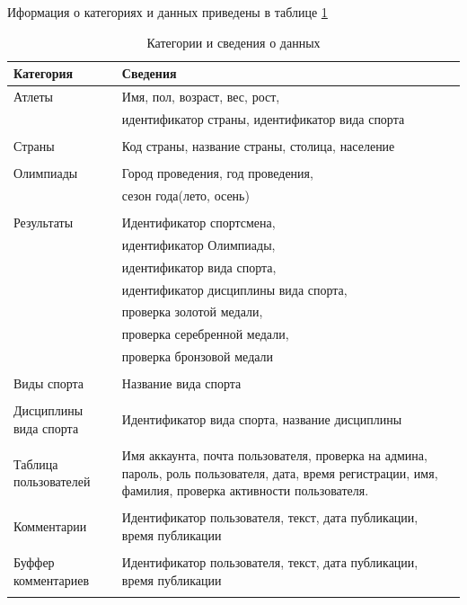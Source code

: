 Иформация о категориях и данных приведены в таблице \ref{tab:category}


\newpage
\begin{table}[h!]
\caption{Категории и сведения о данных}
\label{tab:category}
	\begin{tabular}{ | p{100pt} | p{350pt}  | }
		\hline
		Категория & Сведения   \\ \hline
		
		Атлеты & Имя, пол, возраст, вес, рост, \\
	 	            & идентификатор страны, идентификатор вида спорта  \\
					&   \\ \hline
		Страны & Код страны, название страны, столица, население  \\
					 &   \\ \hline 
		
		
		Олимпиады & Город проведения, год проведения, \\
		                    & сезон года(лето, осень)   \\
		                    &   \\ \hline
		
		Результаты & Идентификатор спортсмена,  \\
		                   &  идентификатор Олимпиады, \\
		                   & идентификатор вида спорта, \\
		                   & идентификатор дисциплины вида спорта, \\
		                   & проверка золотой медали, \\
		                   & проверка серебренной медали, \\
		                   & проверка бронзовой медали \\
		                   &   \\ \hline 
		
		Виды спорта & Название вида спорта  \\
		                     &   \\ \hline 
		                     
		Дисциплины вида спорта & Идентификатор вида спорта, название дисциплины  \\
		&   \\ \hline 
		
		Таблица пользователей & Имя аккаунта, почта пользователя, проверка на админа, пароль, роль пользователя, дата, время регистрации, имя, фамилия, проверка активности пользователя.  \\
		&   \\ \hline   
		
		Комментарии & Идентификатор пользователя, текст, дата публикации, время публикации  \\
		&   \\ \hline 
		
		Буффер комментариев & Идентификатор пользователя, текст, дата публикации, время публикации  \\
		&   \\ \hline 
		 
	\end{tabular}
\end{table}

